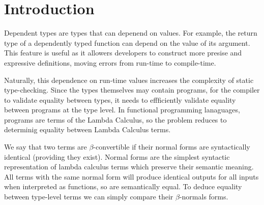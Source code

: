 \chapter{Introduction}
\label{chap:introduction}





Dependent types are types that can depenend on values. For example, the return type of a dependently typed function can depend on the value of its argument. This feature is useful as it allowers developers to construct more presise and expressive definitions, moving errors from run-time to compile-time.

Naturally, this dependence on run-time values increases the complexity of static type-checking. 
Since the types themselves may contain programs, for the compiler to validate equality between types, it needs to effficiently validate equality between programs at the type level.
In functional programming lanaguages, programs are terms of the Lambda Calculus, so the problem reduces to determinig equality between Lambda Calculus terms. 


We say that two terms are $\beta$-convertible if their normal forms are syntactically identical (providing they exist). Normal forms are the simplest syntactic representation of lambda calculus terms which preserve their semantic meaning. All terms with the same normal form will produce identical outputs for all inputs when interpreted as functions, so are semantically equal. To deduce equality between type-level terms we can simply compare their $\beta$-normals forms.

